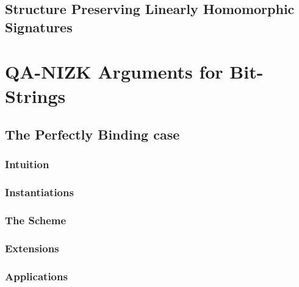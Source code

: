         

    \section{Structure Preserving Linearly Homomorphic Signatures}

        

\chapter {QA-NIZK Arguments for Bit-Strings} \label{sec:bits}

    

    \section{The Perfectly Binding case} \label{sec:bits-binding} 
    
        

        \subsection{Intuition} \label{sec:bits-intuition}

             

        \subsection{Instantiations} \label{sec:bits-instantiations}

            

        \subsection{The Scheme} \label{sec:bits-scheme}

            

        \subsection{Extensions} \label{sec:bits-extensions}

            

        \subsection{Applications} \label{sec:bits-applications}

